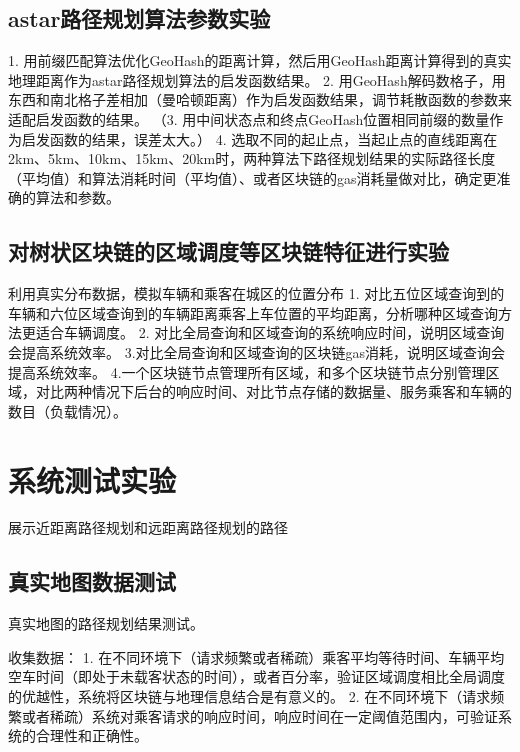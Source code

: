 \subsection{astar路径规划算法参数实验}
1. 用前缀匹配算法优化GeoHash的距离计算，然后用GeoHash距离计算得到的真实地理距离作为astar路径规划算法的启发函数结果。
2. 用GeoHash解码数格子，用东西和南北格子差相加（曼哈顿距离）作为启发函数结果，调节耗散函数的参数来适配启发函数的结果。
（3. 用中间状态点和终点GeoHash位置相同前缀的数量作为启发函数的结果，误差太大。）
4. 选取不同的起止点，当起止点的直线距离在2km、5km、10km、15km、20km时，两种算法下路径规划结果的实际路径长度（平均值）和算法消耗时间（平均值）、或者区块链的gas消耗量做对比，确定更准确的算法和参数。





\subsection{对树状区块链的区域调度等区块链特征进行实验}

利用真实分布数据，模拟车辆和乘客在城区的位置分布
1. 对比五位区域查询到的车辆和六位区域查询到的车辆距离乘客上车位置的平均距离，分析哪种区域查询方法更适合车辆调度。
2. 对比全局查询和区域查询的系统响应时间，说明区域查询会提高系统效率。
3.对比全局查询和区域查询的区块链gas消耗，说明区域查询会提高系统效率。
4.一个区块链节点管理所有区域，和多个区块链节点分别管理区域，对比两种情况下后台的响应时间、对比节点存储的数据量、服务乘客和车辆的数目（负载情况）。

\section{系统测试实验}

展示近距离路径规划和远距离路径规划的路径

\subsection{真实地图数据测试}
真实地图的路径规划结果测试。

收集数据：
1. 在不同环境下（请求频繁或者稀疏）乘客平均等待时间、车辆平均空车时间（即处于未载客状态的时间），或者百分率，验证区域调度相比全局调度的优越性，系统将区块链与地理信息结合是有意义的。
2. 在不同环境下（请求频繁或者稀疏）系统对乘客请求的响应时间，响应时间在一定阈值范围内，可验证系统的合理性和正确性。